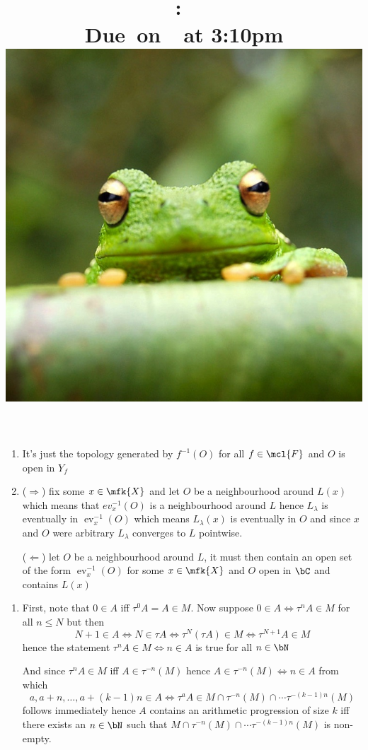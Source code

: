 \documentclass{pset}
\title{
    \vspace{2in}
    \textmd{\textbf{\hmwkClass:\ \hmwkTitle}}\\
    \normalsize\vspace{0.1in}\small{Due\ on\ \hmwkDueDate\ at 3:10pm}\\
    \includegraphics[scale=0.2]{frog} \\
    \vspace{0.1in}\large{\textit{\hmwkClassTime}}
    \vspace{3in}
}
\author{\hmwkAuthorName}
\date{}
\newcommand{\ev}{\operatorname{ev}}
\begin{document}
\maketitle

\pagebreak
\begin{problem}
    \begin{enumerate}
        \item It's just the topology generated by $f^{-1}(O)$ for all $f\in\mcl{F}$ and $O$ is open in $Y_f$
        \item ($\Rightarrow$) fix some $x\in\mfk{X}$ and let $O$ be a neighbourhood around $L(x)$ which means that $ev_x^{-1}(O)$ is a neighbourhood around $L$ hence $L_\lambda$ is eventually in $\ev_x^{-1}(O)$ which means $L_\lambda(x)$ is eventually in $O$ and since $x$ and $O$ were arbitrary $L_\lambda$ converges to $L$ pointwise.
        
        ($\Leftarrow$) let $O$ be a neighbourhood around $L$, it must then contain an open set of the form $\ev_x^{-1}(O)$ for some $x\in\mfk{X}$ and $O$ open in $\bC$ and contains $L(x)$
    \end{enumerate}
\end{problem}
\begin{problem}
    \begin{enumerate}
        \item First, note that $0\in A$ iff  $\tau^0A=A\in M$. Now suppose $0\in A\iff\tau^nA\in M$ for all $n\leq N$ but then
        \[N+1\in A\iff N\in \tau A \iff \tau^N(\tau A)\in M \iff \tau^{N+1}A\in M\]
        hence the statement $\tau^nA\in M\iff n\in A$ is true for all $n\in\bN$

        And since $\tau^nA\in M$ iff $A\in\tau^{-n}(M)$ hence $A\in \tau^{-n}(M)\iff n\in A$ from which
        \[a,a+n,\dots,a+(k-1)n\in A \iff \tau^aA\in M\cap\tau^{-n}(M)\cap\cdots\tau^{-(k-1)n}(M)\]
        follows immediately hence $A$ contains an arithmetic progression of size $k$ iff there exists an $n\in\bN$ such that $M\cap\tau^{-n}(M)\cap\cdots\tau^{-(k-1)n}(M)$ is non-empty.
    \end{enumerate}
\end{problem}
\end{document}
